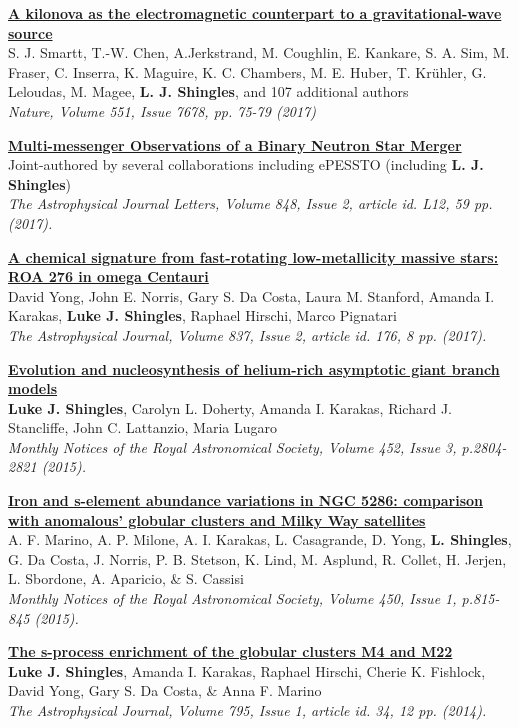 \documentclass[11pt]{res} %
\newcommand{\highlight}[1]{\textbf{#1}}
\newcommand{\articletitle}[1]{{\textbf{\color{black} #1}}\\}
\newcommand{\articleauthors}[1]{#1\\}
\newcommand{\articlejournalref}[1]{\textit{#1}}
\begin{document}
\begin{resume}
\articletitle{\href{http://adsabs.harvard.edu/abs/2017Natur.551...75S}{A kilonova as the electromagnetic counterpart to a gravitational-wave source}}
\articleauthors{S. J. Smartt, T.-W. Chen, A.Jerkstrand, M. Coughlin, E. Kankare, S. A. Sim, M. Fraser, C. Inserra, K. Maguire, K. C. Chambers,
M. E. Huber, T. Kr\"uhler, G. Leloudas, M. Magee, \highlight{L. J. Shingles}, and 107 additional authors}
\articlejournalref{Nature, Volume 551, Issue 7678, pp. 75-79 (2017)}

\articletitle{\href{http://adsabs.harvard.edu/abs/2017ApJ...848L..12A}{Multi-messenger Observations of a Binary Neutron Star Merger}}
\articleauthors{Joint-authored by several collaborations including ePESSTO (including \highlight{L. J. Shingles})}
\articlejournalref{The Astrophysical Journal Letters, Volume 848, Issue 2, article id. L12, 59 pp. (2017).}

\articletitle{\href{http://adsabs.harvard.edu/abs/2017ApJ...837..176Y}{A chemical signature from fast-rotating low-metallicity massive stars: ROA 276 in omega Centauri}}
\articleauthors{David Yong, John E. Norris, Gary S. Da Costa, Laura M. Stanford, Amanda I. Karakas, \highlight{Luke J. Shingles}, Raphael Hirschi, Marco Pignatari}
\articlejournalref{The Astrophysical Journal, Volume 837, Issue 2, article id. 176, 8 pp. (2017).}

\articletitle{\href{http://adsabs.harvard.edu/abs/2015MNRAS.452.2804S}{Evolution and nucleosynthesis of helium-rich asymptotic giant branch models}}
\articleauthors{\highlight{Luke J. Shingles}, Carolyn L. Doherty, Amanda I. Karakas, Richard J. Stancliffe, John C. Lattanzio, Maria Lugaro}
\articlejournalref{Monthly Notices of the Royal Astronomical Society, Volume 452, Issue 3, p.2804-2821 (2015).}

\articletitle{\href{http://adsabs.harvard.edu/abs/2015MNRAS.450..815M}{Iron and s-element abundance variations in NGC 5286: comparison with anomalous' globular clusters and Milky Way satellites}}
\articleauthors{A. F. Marino, A. P. Milone, A. I. Karakas, L. Casagrande, D. Yong, \highlight{L. Shingles}, G. Da Costa, J. Norris, P. B. Stetson,  K. Lind, M. Asplund, R. Collet, H. Jerjen, L. Sbordone, A. Aparicio, \& S. Cassisi}
\articlejournalref{Monthly Notices of the Royal Astronomical Society, Volume 450, Issue 1, p.815-845 (2015).}

\articletitle{\href{http://adsabs.harvard.edu/abs/2014ApJ...795...34S}{The s-process enrichment of the globular clusters M4 and M22}}
\articleauthors{\highlight{Luke J. Shingles}, Amanda I. Karakas, Raphael Hirschi, Cherie K. Fishlock, David Yong, Gary S. Da Costa, \& Anna F. Marino}
\articlejournalref{The Astrophysical Journal, Volume 795, Issue 1, article id. 34, 12 pp. (2014).}


\end{resume}
\end{document}
